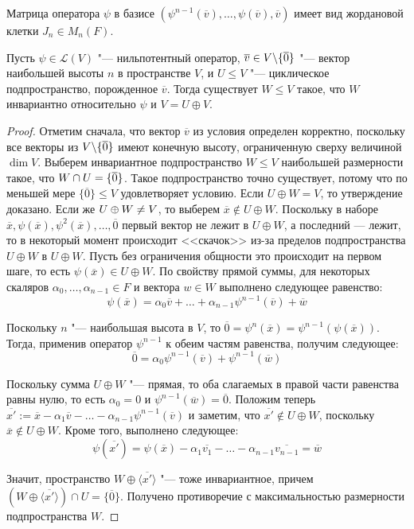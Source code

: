 \begin{note}
	Матрица оператора $\psi$ в базисе $(\psi^{n-1}(\overline{v}), \dots, \psi(\overline{v}), \overline{v})$ имеет вид жордановой клетки $J_n \in M_n(F)$.
\end{note}

\begin{proposition}
	Пусть $\psi \in \mathcal{L}(V)$ "--- нильпотентный оператор, $\overline{v} \in V \backslash \{\overline 0\}$ "--- вектор наибольшей высоты $n$ в пространстве $V$, и $U \le V$ "--- циклическое подпространство, порожденное $\overline{v}$. Тогда существует $W \le V$ такое, что $W$ инвариантно относительно $\psi$ и $V = U \oplus V$.
\end{proposition}

\begin{proof}
	Отметим сначала, что вектор $\overline{v}$ из условия определен корректно, поскольку все векторы из $V \backslash \{\overline 0\}$ имеют конечную высоту, ограниченную сверху величиной $\dim{V}$. Выберем инвариантное подпространство $W \le V$ наибольшей размерности такое, что $W \cap U \hm{=} \{\overline{0}\}$. Такое подпространство точно существует, потому что по меньшей мере $\{\overline{0}\} \le V$ удовлетворяет условию. Если $U \oplus W = V$, то утверждение доказано. Если же $U \oplus W \hm{\ne} V$, то выберем $\overline{x} \not\in U \oplus W$. Поскольку в наборе $\overline{x}, \psi(\overline{x}), \psi^2(\overline{x}), \dots, \overline{0}$ первый вектор не лежит в $U \oplus W$, а последний --- лежит, то в некоторый момент происходит <<скачок>> из-за пределов подпространства $U \oplus W$ в $U \oplus W$. Пусть без ограничения общности это происходит на первом шаге, то есть $\psi(\overline{x}) \in U \oplus W$. По свойству прямой суммы, для некоторых скаляров $\alpha_0, \dotsc, \alpha_{n-1} \in F$ и вектора $w \in W$ выполнено следующее равенство:
	\[\psi(\overline{x}) = \alpha_0\overline{v} + \dots + \alpha_{n - 1}\psi^{n-1}(\overline{v}) + \overline{w}\]
	
	Поскольку $n$ "--- наибольшая высота в $V$, то $\overline{0} = \psi^n(\overline{x}) = \psi^{n-1}(\psi(\overline{x}))$. Тогда, применив оператор $\psi^{n - 1}$ к обеим частям равенства, получим следующее:
	\[\overline{0} = \alpha_0\psi^{n - 1}(\overline{v}) + \psi^{n - 1}(\overline{w})\]
	
	Поскольку сумма $U \oplus W$ "--- прямая, то оба слагаемых в правой части равенства равны нулю, то есть $\alpha_0 = 0$ и $\psi^{n - 1}(\overline{w}) = \overline{0}$. Положим теперь $\overline{x'} := \overline{x} - \alpha_1\overline{v} - \dots - \alpha_{n-1}\psi^{n-1}(\overline{v})$ и заметим, что $\overline{x'} \not\in U \oplus W$, поскольку $\overline x \not\in U \oplus W$. Кроме того, выполнено следующее:
	\[\psi(\overline{x'}) = \psi(\overline{x}) - \alpha_1\overline{v_1} - \dots - \alpha_{n-1}\overline{v_{n-1}} = \overline{w}\]
	
	Значит, пространство $W \oplus \langle\overline{x'}\rangle$ "--- тоже инвариантное, причем $(W \oplus \langle\overline{x'}\rangle) \cap U = \{\overline{0}\}$. Получено противоречие с максимальностью размерности подпространства $W$.
\end{proof}

